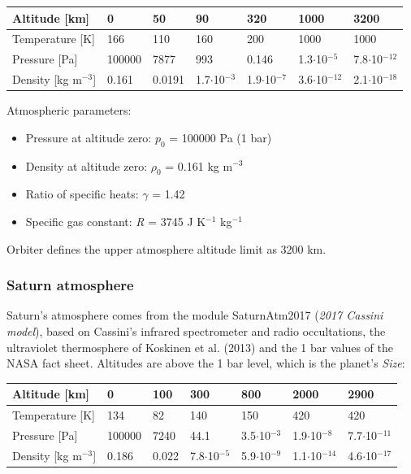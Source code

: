 \documentclass[Orbiter Developer Manual.tex]{subfiles}
\begin{document}
	\begin{longtable}{ |p{}|p{}|p{}|p{}|p{}|p{}|p{}| }
	\hline\rule{0pt}{2ex}
	Altitude [km] & 0 & 50 & 90 & 320 & 1000 & 3200\\
	\hline\rule{0pt}{2ex}
	Temperature [K] & 166 & 110 & 160 & 200 & 1000 & 1000\\
	\hline\rule{0pt}{2ex}
	Pressure [Pa] & 100000 & 7877 & 993 & 0.146 & 1.3$\cdot$10$^{-5}$ & 7.8$\cdot$10$^{-12}$\\
	\hline\rule{0pt}{2ex}
	Density [kg m$^{-3}$] & 0.161 & 0.0191 & 1.7$\cdot$10$^{-3}$ & 1.9$\cdot$10$^{-7}$ & 3.6$\cdot$10$^{-12}$ & 2.1$\cdot$10$^{-18}$\\
	\hline
	\end{longtable}

\noindent
Atmospheric parameters:

\begin{itemize}
\item Pressure at altitude zero: $p_{0}$ = 100000 Pa (1 bar)
\item Density at altitude zero: $\rho_{0}$ = 0.161 kg m$^{-3}$
\item Ratio of specific heats: $\gamma$ = 1.42
\item Specific gas constant: \textit{R} = 3745 J K$^{-1}$ kg$^{-1}$
\end{itemize}

\noindent
Orbiter defines the upper atmosphere altitude limit as 3200 km.


\subsubsection{Saturn atmosphere}
Saturn's atmosphere comes from the module SaturnAtm2017 (\textit{2017 Cassini model}), based on Cassini's infrared spectrometer and radio occultations, the ultraviolet thermosphere of Koskinen et al. (2013) and the 1 bar values of the NASA fact sheet. Altitudes are above the 1 bar level, which is the planet's \textit{Size}:

	\begin{longtable}{ |p{}|p{}|p{}|p{}|p{}|p{}|p{}| }
	\hline\rule{0pt}{2ex}
	Altitude [km] & 0 & 100 & 300 & 800 & 2000 & 2900\\
	\hline\rule{0pt}{2ex}
	Temperature [K] & 134 & 82 & 140 & 150 & 420 & 420\\
	\hline\rule{0pt}{2ex}
	Pressure [Pa] & 100000 & 7240 & 44.1 & 3.5$\cdot$10$^{-3}$ & 1.9$\cdot$10$^{-8}$ & 7.7$\cdot$10$^{-11}$\\
	\hline\rule{0pt}{2ex}
	Density [kg m$^{-3}$] & 0.186 & 0.022 & 7.8$\cdot$10$^{-5}$ & 5.9$\cdot$10$^{-9}$ & 1.1$\cdot$10$^{-14}$ & 4.6$\cdot$10$^{-17}$\\
	\hline
	\end{longtable}
\end{document}
